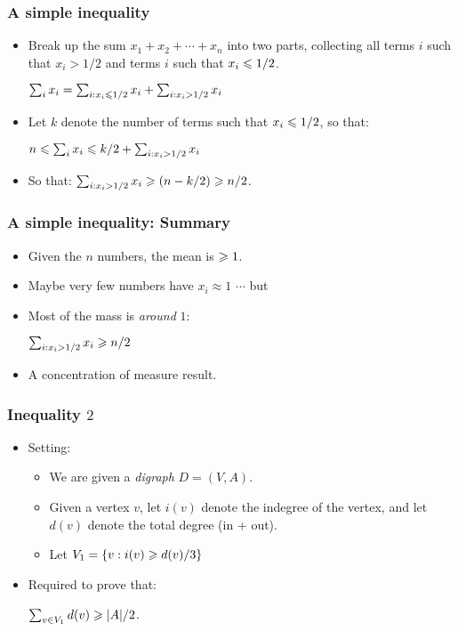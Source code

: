 \documentclass{beamer}
\begin{document}
\begin{frame}
\frametitle{A simple inequality}
\begin{itemize}
\item 
Break up the sum $x_1 + x_2 + \cdots + x_n$ into two parts, collecting all terms $i$ such that $x_i > 1/2$ and 
terms $i$ such that $x_i \leqslant 1/2$.
\begin{center}
$\sum_i x_i = \sum_{i: x_i \leqslant 1/2} x_i + \sum_{i: x_i > 1/2} x_i$
\end{center}
\item 
Let $k$ denote the number of terms such that $x_i \leqslant 1/2$, so that:
\begin{center}
$ n \leqslant \sum_i x_i \leqslant k/2 + \sum_{i: x_i > 1/2} x_i$
\end{center}
\pause
\item So that: $\sum_{i: x_i > 1/2} x_i \geqslant (n - k/2) \geqslant n/2$.
\end{itemize}
\end{frame}

\begin{frame}
\frametitle{A simple inequality: Summary}
\begin{itemize}
\item Given the $n$ numbers, the {\color{red} mean} is $\geqslant 1$. 
\item Maybe very few numbers have $x_i \approx 1$ $\cdots$ but \pause
\item Most of the {\color{blue} mass} is {\em around} $1$:
\begin{center}
$\sum_{i: x_i > 1/2} x_i \geqslant n/2$
\end{center}
\pause
\item A concentration of measure result. 
\end{itemize}
\end{frame}

\begin{frame}
\frametitle{Inequality $2$}
\begin{itemize}
\item Setting: 
\begin{itemize}
\item
We are given a {\em digraph} $D = (V, A)$. 
\item 
Given a vertex $v$, let $i(v)$ denote the 
indegree of the vertex, and let $d(v)$ denote the total degree (in + out). 
\item 
Let $V_1 = \{v : i(v) \geqslant d(v)/3\}$
\end{itemize}
\item Required to prove that: 
\begin{center}
$\sum_{v\in V_1} d(v) \geqslant |A|/2$. 
\end{center}
\end{itemize}
\end{frame}
\end{document}
